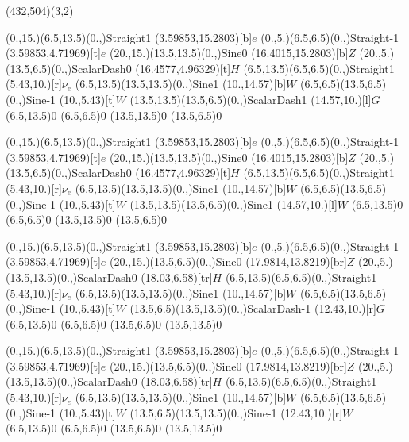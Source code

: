 \unitlength=1bp%

\begin{feynartspicture}(432,504)(3,2)

\FADiagram{}
\FAProp(0.,15.)(6.5,13.5)(0.,){Straight}{1}
\FALabel(3.59853,15.2803)[b]{$e$}
\FAProp(0.,5.)(6.5,6.5)(0.,){Straight}{-1}
\FALabel(3.59853,4.71969)[t]{$e$}
\FAProp(20.,15.)(13.5,13.5)(0.,){Sine}{0}
\FALabel(16.4015,15.2803)[b]{$Z$}
\FAProp(20.,5.)(13.5,6.5)(0.,){ScalarDash}{0}
\FALabel(16.4577,4.96329)[t]{$H$}
\FAProp(6.5,13.5)(6.5,6.5)(0.,){Straight}{1}
\FALabel(5.43,10.)[r]{$\nu_e$}
\FAProp(6.5,13.5)(13.5,13.5)(0.,){Sine}{1}
\FALabel(10.,14.57)[b]{$W$}
\FAProp(6.5,6.5)(13.5,6.5)(0.,){Sine}{-1}
\FALabel(10.,5.43)[t]{$W$}
\FAProp(13.5,13.5)(13.5,6.5)(0.,){ScalarDash}{1}
\FALabel(14.57,10.)[l]{$G$}
\FAVert(6.5,13.5){0}
\FAVert(6.5,6.5){0}
\FAVert(13.5,13.5){0}
\FAVert(13.5,6.5){0}

\FADiagram{}
\FAProp(0.,15.)(6.5,13.5)(0.,){Straight}{1}
\FALabel(3.59853,15.2803)[b]{$e$}
\FAProp(0.,5.)(6.5,6.5)(0.,){Straight}{-1}
\FALabel(3.59853,4.71969)[t]{$e$}
\FAProp(20.,15.)(13.5,13.5)(0.,){Sine}{0}
\FALabel(16.4015,15.2803)[b]{$Z$}
\FAProp(20.,5.)(13.5,6.5)(0.,){ScalarDash}{0}
\FALabel(16.4577,4.96329)[t]{$H$}
\FAProp(6.5,13.5)(6.5,6.5)(0.,){Straight}{1}
\FALabel(5.43,10.)[r]{$\nu_e$}
\FAProp(6.5,13.5)(13.5,13.5)(0.,){Sine}{1}
\FALabel(10.,14.57)[b]{$W$}
\FAProp(6.5,6.5)(13.5,6.5)(0.,){Sine}{-1}
\FALabel(10.,5.43)[t]{$W$}
\FAProp(13.5,13.5)(13.5,6.5)(0.,){Sine}{1}
\FALabel(14.57,10.)[l]{$W$}
\FAVert(6.5,13.5){0}
\FAVert(6.5,6.5){0}
\FAVert(13.5,13.5){0}
\FAVert(13.5,6.5){0}

\FADiagram{}
\FAProp(0.,15.)(6.5,13.5)(0.,){Straight}{1}
\FALabel(3.59853,15.2803)[b]{$e$}
\FAProp(0.,5.)(6.5,6.5)(0.,){Straight}{-1}
\FALabel(3.59853,4.71969)[t]{$e$}
\FAProp(20.,15.)(13.5,6.5)(0.,){Sine}{0}
\FALabel(17.9814,13.8219)[br]{$Z$}
\FAProp(20.,5.)(13.5,13.5)(0.,){ScalarDash}{0}
\FALabel(18.03,6.58)[tr]{$H$}
\FAProp(6.5,13.5)(6.5,6.5)(0.,){Straight}{1}
\FALabel(5.43,10.)[r]{$\nu_e$}
\FAProp(6.5,13.5)(13.5,13.5)(0.,){Sine}{1}
\FALabel(10.,14.57)[b]{$W$}
\FAProp(6.5,6.5)(13.5,6.5)(0.,){Sine}{-1}
\FALabel(10.,5.43)[t]{$W$}
\FAProp(13.5,6.5)(13.5,13.5)(0.,){ScalarDash}{-1}
\FALabel(12.43,10.)[r]{$G$}
\FAVert(6.5,13.5){0}
\FAVert(6.5,6.5){0}
\FAVert(13.5,6.5){0}
\FAVert(13.5,13.5){0}

\FADiagram{}
\FAProp(0.,15.)(6.5,13.5)(0.,){Straight}{1}
\FALabel(3.59853,15.2803)[b]{$e$}
\FAProp(0.,5.)(6.5,6.5)(0.,){Straight}{-1}
\FALabel(3.59853,4.71969)[t]{$e$}
\FAProp(20.,15.)(13.5,6.5)(0.,){Sine}{0}
\FALabel(17.9814,13.8219)[br]{$Z$}
\FAProp(20.,5.)(13.5,13.5)(0.,){ScalarDash}{0}
\FALabel(18.03,6.58)[tr]{$H$}
\FAProp(6.5,13.5)(6.5,6.5)(0.,){Straight}{1}
\FALabel(5.43,10.)[r]{$\nu_e$}
\FAProp(6.5,13.5)(13.5,13.5)(0.,){Sine}{1}
\FALabel(10.,14.57)[b]{$W$}
\FAProp(6.5,6.5)(13.5,6.5)(0.,){Sine}{-1}
\FALabel(10.,5.43)[t]{$W$}
\FAProp(13.5,6.5)(13.5,13.5)(0.,){Sine}{-1}
\FALabel(12.43,10.)[r]{$W$}
\FAVert(6.5,13.5){0}
\FAVert(6.5,6.5){0}
\FAVert(13.5,6.5){0}
\FAVert(13.5,13.5){0}


\end{feynartspicture}
